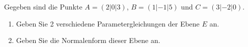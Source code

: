 \begin{ExerciseBlock}
Gegeben sind die Punkte $A=(2|0|3)$, $B=(1|-1|5)$ und $C=(3|-2|0)$.
\begin{enumerate}[label=\alph*)]
	\item Geben Sie 2 verschiedene Parametergleichungen der Ebene $E$ an.
	\item Geben Sie die Normalenform dieser Ebene an.
\end{enumerate}

\end{ExerciseBlock}
